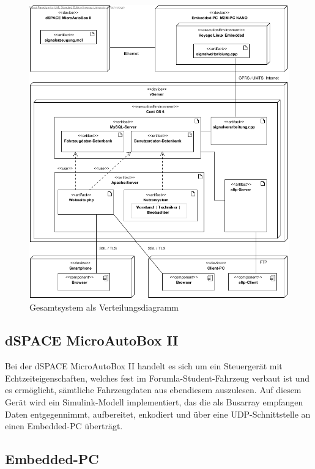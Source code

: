 \documentclass[fontsize = 12pt, paper = a4]{scrreprt}
\begin{document}
\begin{figure}[h]
\centering
\includegraphics[scale = 0.7]{verteilungsdiagramm.png}
\caption[Verteilungsdiagramm Gesamtsystem]{Gesamtsystem als Verteilungsdiagramm} 

\end{figure}

\subsection{dSPACE MicroAutoBox II}

Bei der dSPACE MicroAutoBox II handelt es sich um ein Steuergerät mit Echtzeiteigenschaften, welches fest im Forumla-Student-Fahrzeug verbaut ist und es ermöglicht, sämtliche Fahrzeugdaten aus ebendiesem auszulesen. Auf diesem Gerät wird ein Simulink-Modell implementiert, das die als Busarray empfangen Daten entgegennimmt, aufbereitet, enkodiert und über eine UDP-Schnittstelle an einen Embedded-PC überträgt. 

\subsection{Embedded-PC}
\end{document}
